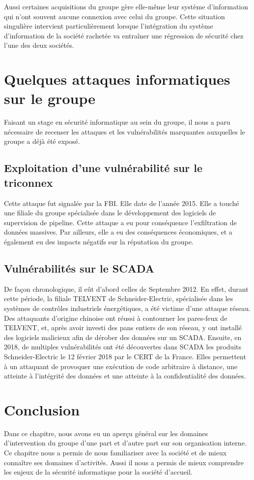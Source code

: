 \documentclass[a4paper,12pt]{book}
\theoremstyle{break}
\begin{document}
Aussi certaines acquisitions du groupe gère elle-même leur système d’information qui n’ont souvent aucune connexion avec celui du groupe. Cette situation singulière intervient particulièrement lorsque l'intégration du système d'information de la société rachetée va entraîner une régression de sécurité chez l'une des deux sociétés. 

\section{Quelques attaques informatiques sur le groupe}
Faisant un stage en sécurité informatique au sein du groupe, il nous a paru nécessaire de recenser les attaques et les vulnérabilités marquantes auxquelles le groupe a déjà été exposé.  
\subsection{Exploitation d'une vulnérabilité sur le triconnex}
Cette attaque fut signalée par la \ac{FBI}. Elle date de l’année 2015. Elle a touché une filiale du groupe spécialisée dans le développement des logiciels de supervision de pipeline. Cette attaque a eu pour conséquence l’exfiltration de données massives. 
\newline
Par ailleurs, elle a eu des conséquences économiques, et a également eu des impacts négatifs sur la réputation du groupe.  

\subsection{Vulnérabilités sur le SCADA}
De façon chronologique, il eût d'abord celles de Septembre 2012. En effet, durant cette période, la filiale TELVENT de Schneider-Electric, spécialisée dans les systèmes de contrôles industriels énergétiques, a été victime d’une attaque réseau. Des attaquants d’origine chinoise ont réussi à contourner les pares-feux de TELVENT, et, après avoir investi des pans entiers de son réseau, y ont installé des logiciels malicieux afin de dérober des données sur un \ac{SCADA}.
\newline
Ensuite, en 2018, de multiples vulnérabilités ont été découvertes dans SCADA les produits Schneider-Electric le 12 février 2018 par le \ac{CERT} de la France. Elles permettent à un attaquant de provoquer une exécution de code arbitraire à distance, une atteinte à l'intégrité des données et une atteinte à la confidentialité des données.

\section*{Conclusion}
Dans ce chapitre, nous avons eu un aperçu général sur les domaines d'intervention du groupe d'une part et d'autre part sur son organisation interne. 
\\Ce chapitre nous a permis de nous familiariser avec la société et de mieux connaître ses domaines d'activités. Aussi il nous a permis de mieux comprendre les enjeux de la sécurité informatique pour la société d'accueil. 
\end{document}

